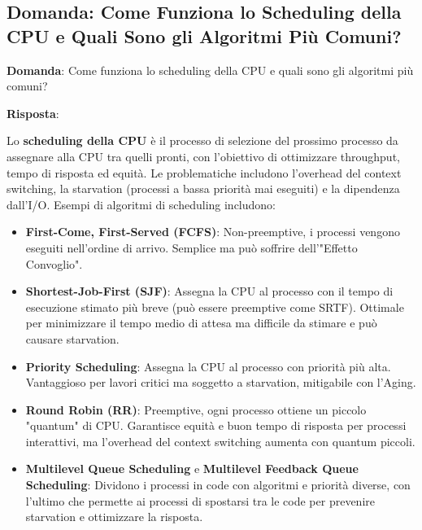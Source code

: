 
\subsection*{Domanda: Come Funziona lo Scheduling della CPU e Quali Sono gli Algoritmi Più Comuni?}

\textbf{Domanda}: Come funziona lo scheduling della CPU e quali sono gli algoritmi più comuni?

\textbf{Risposta}:

Lo \textbf{scheduling della CPU} è il processo di selezione del prossimo processo da assegnare alla CPU tra quelli pronti, con l'obiettivo di ottimizzare throughput, tempo di risposta ed equità. Le problematiche includono l'overhead del context switching, la starvation (processi a bassa priorità mai eseguiti) e la dipendenza dall'I/O. Esempi di algoritmi di scheduling includono:
\begin{itemize}
    \item \textbf{First-Come, First-Served (FCFS)}: Non-preemptive, i processi vengono eseguiti nell'ordine di arrivo. Semplice ma può soffrire dell'"Effetto Convoglio".
    \item \textbf{Shortest-Job-First (SJF)}: Assegna la CPU al processo con il tempo di esecuzione stimato più breve (può essere preemptive come SRTF). Ottimale per minimizzare il tempo medio di attesa ma difficile da stimare e può causare starvation.
    \item \textbf{Priority Scheduling}: Assegna la CPU al processo con priorità più alta. Vantaggioso per lavori critici ma soggetto a starvation, mitigabile con l'Aging.
    \item \textbf{Round Robin (RR)}: Preemptive, ogni processo ottiene un piccolo "quantum" di CPU. Garantisce equità e buon tempo di risposta per processi interattivi, ma l'overhead del context switching aumenta con quantum piccoli.
    \item \textbf{Multilevel Queue Scheduling} e \textbf{Multilevel Feedback Queue Scheduling}: Dividono i processi in code con algoritmi e priorità diverse, con l'ultimo che permette ai processi di spostarsi tra le code per prevenire starvation e ottimizzare la risposta.
\end{itemize}